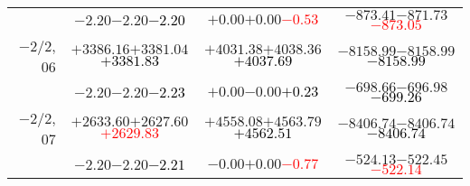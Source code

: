 \documentclass[compress]{beamer}
\begin{document}
\begin{frame}
{\begin{tabular}{r | c | c | c}
           & $-2.20$\hspace{0.1 cm}$-2.20$\hspace{0.1 cm}\textcolor{black}{$-2.20$} & $+0.00$\hspace{0.1 cm}$+0.00$\hspace{0.1 cm}\textcolor{red}{$-0.53$} & $-873.41$\hspace{0.1 cm}$-871.73$\hspace{0.1 cm}\textcolor{red}{$-873.05$} \\
$-$2/2, 06 & $+3386.16$\hspace{0.1 cm}$+3381.04$\hspace{0.1 cm}\textcolor{black}{$+3381.83$} & $+4031.38$\hspace{0.1 cm}$+4038.36$\hspace{0.1 cm}\textcolor{black}{$+4037.69$} & $-8158.99$\hspace{0.1 cm}$-8158.99$\hspace{0.1 cm}\textcolor{black}{$-8158.99$} \\
           & $-2.20$\hspace{0.1 cm}$-2.20$\hspace{0.1 cm}\textcolor{black}{$-2.23$} & $+0.00$\hspace{0.1 cm}$-0.00$\hspace{0.1 cm}\textcolor{black}{$+0.23$} & $-698.66$\hspace{0.1 cm}$-696.98$\hspace{0.1 cm}\textcolor{black}{$-699.26$} \\
$-$2/2, 07 & $+2633.60$\hspace{0.1 cm}$+2627.60$\hspace{0.1 cm}\textcolor{red}{$+2629.83$} & $+4558.08$\hspace{0.1 cm}$+4563.79$\hspace{0.1 cm}\textcolor{black}{$+4562.51$} & $-8406.74$\hspace{0.1 cm}$-8406.74$\hspace{0.1 cm}\textcolor{black}{$-8406.74$} \\
           & $-2.20$\hspace{0.1 cm}$-2.20$\hspace{0.1 cm}\textcolor{black}{$-2.21$} & $-0.00$\hspace{0.1 cm}$+0.00$\hspace{0.1 cm}\textcolor{red}{$-0.77$} & $-524.13$\hspace{0.1 cm}$-522.45$\hspace{0.1 cm}\textcolor{red}{$-522.14$} \\

\end{tabular}}
\end{frame}
\end{document}
